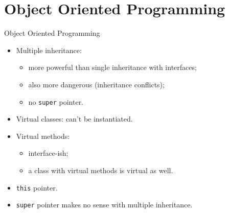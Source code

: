 \documentclass[presentation]{beamer}
\begin{document}
\section{Object Oriented Programming}
\label{sec:org67736a2}
\begin{frame}[label={sec:orgc71cd3d},fragile]{Object Oriented Programming}
 \begin{itemize}
\item Multiple inheritance:
\begin{itemize}
\item more powerful than single inheritance with interfaces;
\item also more dangerous (inheritance conflicts);
\item no \texttt{super} pointer.
\end{itemize}
\item Virtual classes: can't be instantiated.
\item Virtual methods:
\begin{itemize}
\item interface-ish;
\item a class with virtual methods is virtual as well.
\end{itemize}
\item \texttt{this} pointer.
\item \texttt{super} pointer makes no sense with multiple inheritance.
\end{itemize}
\end{frame}
\end{document}
